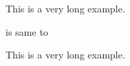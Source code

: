 \documentclass{article}
\begin{document}
{\huge This is a very long example.}

is same to

\begin{huge}
 This is a very long example.
\end{huge}
\end{document}
